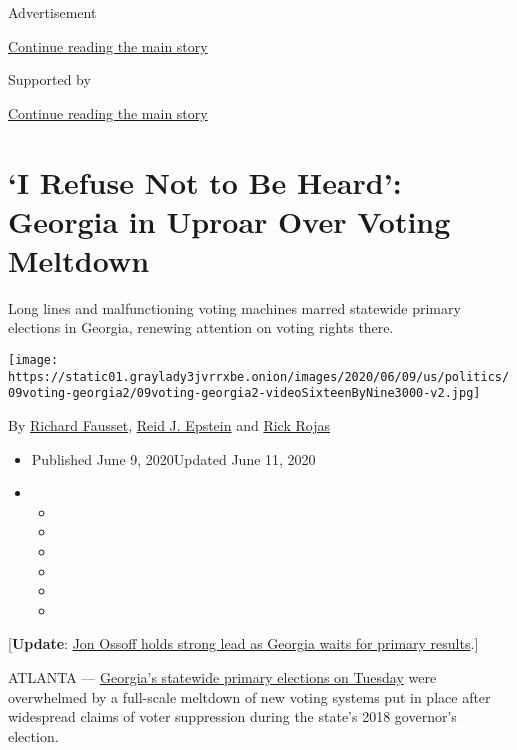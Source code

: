 Advertisement

\protect\hyperlink{after-top}{Continue reading the main story}

Supported by

\protect\hyperlink{after-sponsor}{Continue reading the main story}

\hypertarget{i-refuse-not-to-be-heard-georgia-in-uproar-over-voting-meltdown}{%
\section{`I Refuse Not to Be Heard': Georgia in Uproar Over Voting
Meltdown}\label{i-refuse-not-to-be-heard-georgia-in-uproar-over-voting-meltdown}}

Long lines and malfunctioning voting machines marred statewide primary
elections in Georgia, renewing attention on voting rights there.

\texttt{[image: https://static01.graylady3jvrrxbe.onion/images/2020/06/09/us/politics/09voting-georgia2/09voting-georgia2-videoSixteenByNine3000-v2.jpg]}

By \href{https://www.nytimes3xbfgragh.onion/by/richard-fausset}{Richard
Fausset},
\href{https://www.nytimes3xbfgragh.onion/by/reid-j-epstein}{Reid J.
Epstein} and
\href{https://www.nytimes3xbfgragh.onion/by/rick-rojas}{Rick Rojas}

\begin{itemize}
\item
  Published June 9, 2020Updated June 11, 2020
\item
  \begin{itemize}
  \item
  \item
  \item
  \item
  \item
  \item
  \end{itemize}
\end{itemize}

{[}\textbf{Update}:
\href{https://www.nytimes3xbfgragh.onion/2020/06/10/us/politics/jon-ossoff-georgia-senate.html}{Jon
Ossoff holds strong lead as Georgia waits for primary results}.{]}

ATLANTA ---
\href{https://www.nytimes3xbfgragh.onion/2020/06/10/us/politics/georgia-primary-election-voting.html}{Georgia's
statewide primary elections on Tuesday} were overwhelmed by a full-scale
meltdown of new voting systems put in place after widespread claims of
voter suppression during the state's 2018 governor's election.

